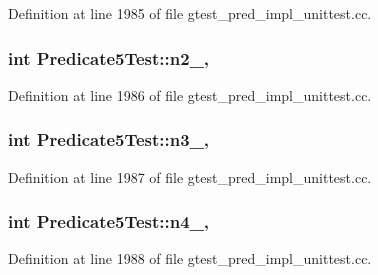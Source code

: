 Definition at line 1985 of file gtest\+\_\+pred\+\_\+impl\+\_\+unittest.\+cc.

\subsubsection[{\texorpdfstring{n2\+\_\+}{n2_}}]{\setlength{\rightskip}{0pt plus 5cm}int Predicate5\+Test\+::n2\+\_\+\hspace{0.3cm}{\ttfamily [static]}, {\ttfamily [protected]}}\hypertarget{class_predicate5_test_a5bf48ba65b7baf20abe1d2af90779ce0}{}\label{class_predicate5_test_a5bf48ba65b7baf20abe1d2af90779ce0}


Definition at line 1986 of file gtest\+\_\+pred\+\_\+impl\+\_\+unittest.\+cc.

\subsubsection[{\texorpdfstring{n3\+\_\+}{n3_}}]{\setlength{\rightskip}{0pt plus 5cm}int Predicate5\+Test\+::n3\+\_\+\hspace{0.3cm}{\ttfamily [static]}, {\ttfamily [protected]}}\hypertarget{class_predicate5_test_a63723efb915dbf418c31b97b64dabc0e}{}\label{class_predicate5_test_a63723efb915dbf418c31b97b64dabc0e}


Definition at line 1987 of file gtest\+\_\+pred\+\_\+impl\+\_\+unittest.\+cc.

\subsubsection[{\texorpdfstring{n4\+\_\+}{n4_}}]{\setlength{\rightskip}{0pt plus 5cm}int Predicate5\+Test\+::n4\+\_\+\hspace{0.3cm}{\ttfamily [static]}, {\ttfamily [protected]}}\hypertarget{class_predicate5_test_a5d66aa58badddc8d3d8070a93c0558d6}{}\label{class_predicate5_test_a5d66aa58badddc8d3d8070a93c0558d6}


Definition at line 1988 of file gtest\+\_\+pred\+\_\+impl\+\_\+unittest.\+cc.

